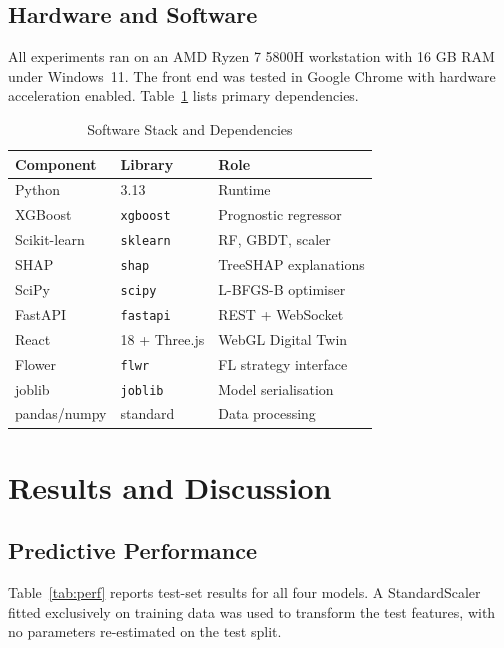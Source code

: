 \documentclass[10pt, journal, letterpaper]{IEEEtran}
\begin{document}
\subsection{Hardware and Software}

All experiments ran on an AMD Ryzen 7 5800H workstation with 16 GB RAM
under Windows~11. The front end was tested in Google Chrome with hardware
acceleration enabled. Table~\ref{tab:software} lists primary dependencies.

\begin{table}[htbp]
\caption{Software Stack and Dependencies}
\label{tab:software}
\centering\small
\begin{tabular}{lll}
\toprule
\textbf{Component} & \textbf{Library} & \textbf{Role} \\
\midrule
Python        & 3.13              & Runtime \\
XGBoost       & \texttt{xgboost}~\cite{chen2016xgboost} & Prognostic regressor \\
Scikit-learn  & \texttt{sklearn}  & RF, GBDT, scaler \\
SHAP          & \texttt{shap}~\cite{lundberg2017}     & TreeSHAP explanations \\
SciPy         & \texttt{scipy}    & L-BFGS-B optimiser \\
FastAPI       & \texttt{fastapi}  & REST + WebSocket \\
React         & 18 + Three.js     & WebGL Digital Twin \\
Flower        & \texttt{flwr}     & FL strategy interface \\
joblib        & \texttt{joblib}   & Model serialisation \\
pandas/numpy  & standard          & Data processing \\
\bottomrule
\end{tabular}
\end{table}

\section{Results and Discussion}
\label{sec:results}

\subsection{Predictive Performance}

Table~\ref{tab:perf} reports test-set results for all four models.
A StandardScaler fitted exclusively on training data was used to transform
the test features, with no parameters re-estimated on the test split.
\end{document}

